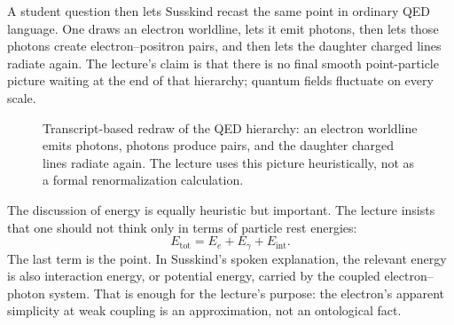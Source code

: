 A student question then lets Susskind recast the same point in ordinary QED language. One draws an electron worldline, lets it emit photons, then lets those photons create electron--positron pairs, and then lets the daughter charged lines radiate again. The lecture's claim is that there is no final smooth point-particle picture waiting at the end of that hierarchy; quantum fields fluctuate on every scale.

\begin{figure}[h]
\centering
{}
\caption{Transcript-based redraw of the QED hierarchy: an electron worldline emits photons, photons produce pairs, and the daughter charged lines radiate again. The lecture uses this picture heuristically, not as a formal renormalization calculation.}
\end{figure}

The discussion of energy is equally heuristic but important. The lecture insists that one should not think only in terms of particle rest energies:
\begin{equation}
E_{\mathrm{tot}} = E_{e} + E_{\gamma} + E_{\mathrm{int}}.
\end{equation}
The last term is the point. In Susskind's spoken explanation, the relevant energy is also interaction energy, or potential energy, carried by the coupled electron--photon system. That is enough for the lecture's purpose: the electron's apparent simplicity at weak coupling is an approximation, not an ontological fact.

